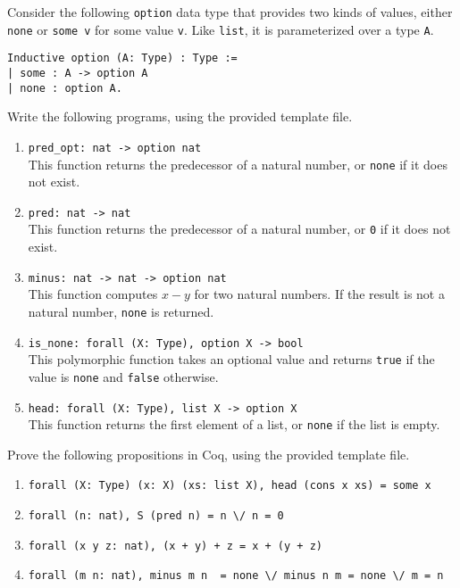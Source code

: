 \documentclass[language=en,sheet=6,prefix]{exercise}
\begin{document}

   Consider the following \lstinline|option| data type that provides two kinds of values, either \lstinline|none| or \lstinline|some v| for some value \lstinline|v|. Like \lstinline|list|, it is parameterized over a type \lstinline|A|.
\begin{lstlisting}[numbers=none,xleftmargin=0em]
Inductive option (A: Type) : Type :=
| some : A -> option A
| none : option A.
\end{lstlisting}
Write the following programs, using the provided template file.
  \begin{enumerate}[label=(\roman*)]
    \item \lstinline|pred_opt: nat -> option nat|\\
    This function returns the predecessor of a natural number, or \lstinline|none| if it does not exist.
		\item \lstinline|pred: nat -> nat|\\
    This function returns the predecessor of a natural number, or \lstinline|0| if it does not exist.
    \item \lstinline|minus: nat -> nat -> option nat|\\
    This function computes $x - y$ for two natural numbers. If the result is not a natural number, \lstinline|none| is returned.
    \item \lstinline|is_none: forall (X: Type), option X -> bool|\\
    This polymorphic function takes an optional value and returns \lstinline|true| if the value is \lstinline|none| and \lstinline|false| otherwise.
    \item \lstinline|head: forall (X: Type), list X -> option X|\\
    This function returns the first element of a list, or \lstinline|none| if the list is empty.
  \end{enumerate}

  Prove the following propositions in Coq, using the provided template file.

  \begin{enumerate}[label=(\roman*)]
		\item \lstinline|forall (X: Type) (x: X) (xs: list X), head (cons x xs) =|~\lstinline|some x|
		\item \lstinline|forall (n: nat), S (pred n) =|~\lstinline|n \/|~\lstinline|n|~\lstinline|= 0|
		\item \lstinline|forall (x y z: nat), (x + y) + z =|~\lstinline|x + (y + z)|
		\item \lstinline|forall (m n: nat), minus m n |~\lstinline|= none \/|~\lstinline|minus n m =|~\lstinline|none \/|~\lstinline|m =|~\lstinline|n|
  \end{enumerate}
\end{document}
